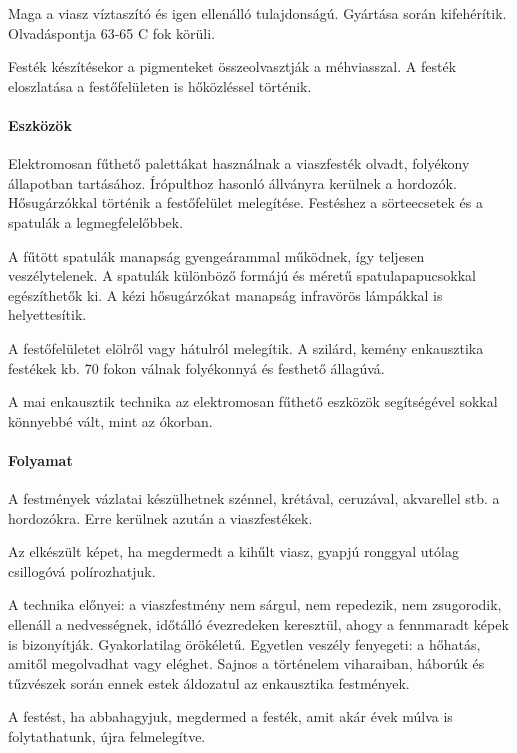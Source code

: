 Maga a viasz víztaszító és igen ellenálló tulajdonságú. Gyártása során kifehérítik. Olvadáspontja 63-65 C fok körüli.

Festék készítésekor a pigmenteket összeolvasztják a méhviasszal. A festék eloszlatása a festőfelületen is hőközléssel történik.

\paragraph{Eszközök}
Elektromosan fűthető palettákat használnak a viaszfesték olvadt, folyékony állapotban tartásához. Írópulthoz hasonló állványra kerülnek a hordozók. Hősugárzókkal történik a festőfelület melegítése. Festéshez a sörteecsetek és a spatulák a legmegfelelőbbek.

A fűtött spatulák manapság gyengeárammal működnek, így teljesen veszélytelenek. A spatulák különböző formájú és méretű spatulapapucsokkal egészíthetők ki. A kézi hősugárzókat manapság infravörös lámpákkal is helyettesítik.

A festőfelületet elölről vagy hátulról melegítik. A szilárd, kemény enkausztika festékek kb. 70 fokon válnak folyékonnyá és festhető állagúvá.

A mai enkausztik technika az elektromosan fűthető eszközök segítségével sokkal könnyebbé vált, mint az ókorban.

\paragraph{Folyamat}
A festmények vázlatai készülhetnek szénnel, krétával, ceruzával, akvarellel stb. a hordozókra. Erre kerülnek azután a viaszfestékek.

Az elkészült képet, ha megdermedt a kihűlt viasz, gyapjú ronggyal utólag csillogóvá polírozhatjuk.

A technika előnyei: a viaszfestmény nem sárgul, nem repedezik, nem zsugorodik, ellenáll a nedvességnek, időtálló évezredeken keresztül, ahogy a fennmaradt képek is bizonyítják. Gyakorlatilag örökéletű. Egyetlen veszély fenyegeti: a hőhatás, amitől megolvadhat vagy eléghet. Sajnos a történelem viharaiban, háborúk és tűzvészek során ennek estek áldozatul az enkausztika festmények.

A festést, ha abbahagyjuk, megdermed a festék, amit akár évek múlva is folytathatunk, újra felmelegítve.